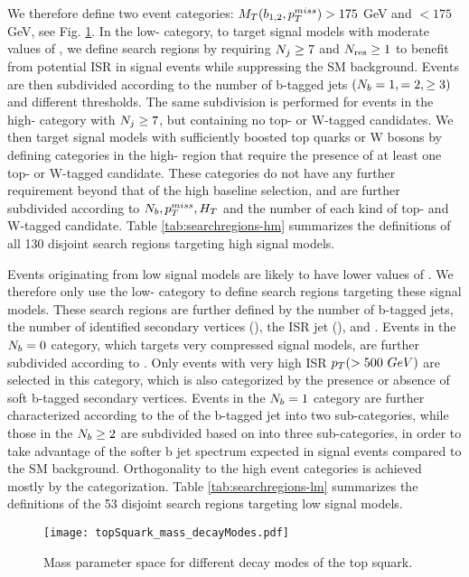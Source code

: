 We therefore define two event categories: $M_{T}(b_{1,2},p_{T}^{miss})>175$ GeV and $< 175$ GeV, see Fig. \ref{StopParameterSpace}. In the low-\mtb{} category, to target signal models with moderate values of \dm, we define search regions by requiring $N_{j}\geq7$ and $N_{\text{res}}\geq1$ to benefit from potential ISR in signal events while suppressing the SM background. Events are then subdivided according to the number of b-tagged jets $(N_{b}=1,=2,\geq3)$ and different \met{} thresholds. The same subdivision is performed for events in the high-\mtb{} category with $N_{j}\geq7$, but containing no top- or W-tagged candidates. We then target signal models with sufficiently boosted top quarks or W bosons by defining categories in the high-\mtb{} region that require the presence of at least one top- or W-tagged candidate. These categories do not have any further \nj{} requirement beyond that of the high \dm{} baseline selection, and are further subdivided according to $N_{b}, p_{T}^{miss}, H_{T}$ and the number of each kind of top- and W-tagged candidate. Table \ref{tab:searchregions-hm} summarizes the definitions of all 130 disjoint search regions targeting high \dm{} signal models.

Events originating from low \dm{} signal models are likely to have lower values of \mtb \cite{sirunyan_search_2017}. We therefore only use the low-\mtb{} category to define search regions targeting these signal models. These search regions are further defined by the number of b-tagged jets, the number of identified secondary vertices (\nsv), the ISR jet \pt{} (\ptb), and \met. Events in the $N_{b}=0$ category, which targets very compressed signal models, are further subdivided according to \nj. Only events with very high ISR $p_{T}(>500~GeV)$ are selected in this category, which is also categorized by the presence or absence of soft b-tagged secondary vertices. Events in the $N_{b}=1$ category are further characterized according to the \pt{} of the b-tagged jet into two sub-categories, while those in the $N_{b}\geq2$ are subdivided based on \ptbonetwo{} into three sub-categories, in order to take advantage of the softer b jet \pt{} spectrum expected in signal events compared to the SM background. Orthogonality to the high \dm{} event categories is achieved mostly by the \mtb{} categorization. Table \ref{tab:searchregions-lm}  summarizes the definitions of the 53 disjoint search regions targeting low \dm{} signal models.

\begin{figure}
 	\centering
	\texttt{[image: topSquark\_mass\_decayModes.pdf]}
 	\caption[Top Squark Decay Modes]{Mass parameter space for different decay modes of the top squark.}
 	\label{StopParameterSpace} 
\end{figure}


